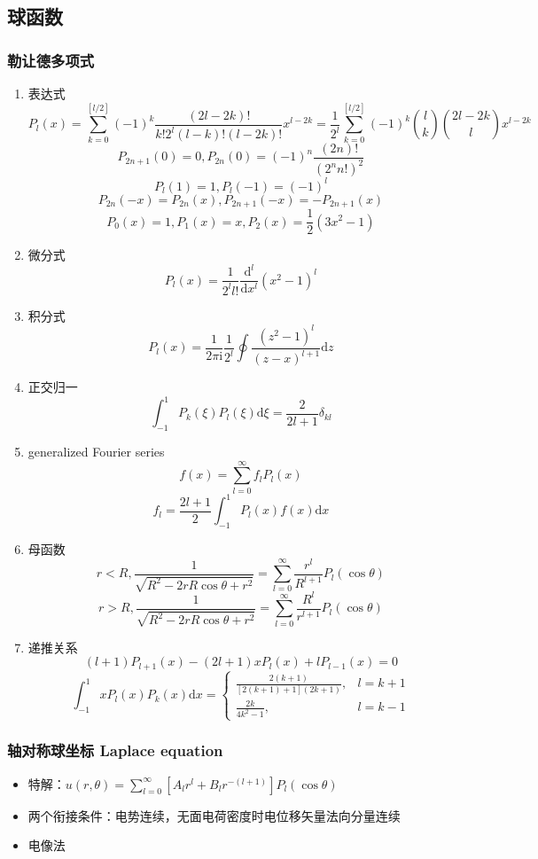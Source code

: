 \documentclass{article}
\begin{document}
\subsection{球函数}

\subsubsection{勒让德多项式}

\begin{enumerate}
    \item 表达式 $$P_l(x)=\sum^{[l/2]}_{k=0}(-1)^k\frac{(2l-2k)!}{k!2^l(l-k)!(l-2k)!}x^{l-2k}={\frac {1}{2^{l}}}\sum _{k=0}^{[l/2]}(-1)^{k}{\binom {l}{k}}{\binom {2l-2k}{l}}x^{l-2k}$$ $$P_{2n+1}(0)=0, P_{2n}(0)=(-1)^n\frac{(2n)!}{(2^nn!)^2}$$ $$P_l(1)=1, P_l(-1)=(-1)^l$$ $$P_{2n}(-x)=P_{2n}(x), P_{2n+1}(-x)=-P_{2n+1}(x)$$ $$P_0(x)=1, P_1(x)=x, P_2(x)=\frac{1}{2}(3x^2-1)$$
    \item 微分式 $$P_l(x)=\frac{1}{2^ll!}\frac{\mathrm{d}^l}{\mathrm{d}x^l}(x^2-1)^l$$
    \item 积分式 $$P_l(x)=\frac{1}{2\pi\mathrm{i}}\frac{1}{2^l}\oint\frac{(z^2-1)^l}{(z-x)^{l+1}}\mathrm{d}z$$
    \item 正交归一 $$\int^1_{-1}P_k(\xi)P_l(\xi)\mathrm{d}\xi=\frac{2}{2l+1}\delta_{kl}$$
    \item generalized Fourier series $$f(x)=\sum^\infty_{l=0}f_lP_l(x)$$ $$f_l=\frac{2l+1}{2}\int^1_{-1}P_l(x)f(x)\mathrm{d}x$$
    \item 母函数 $$r<R,\frac{1}{\sqrt{R^2-2rR\cos\theta+r^2}}=\sum^\infty_{l=0}\frac{r^l}{R^{l+1}}P_l(\cos\theta)$$ $$r>R,\frac{1}{\sqrt{R^2-2rR\cos\theta+r^2}}=\sum^\infty_{l=0}\frac{R^l}{r^{l+1}}P_l(\cos\theta)$$
    \item 递推关系 $$(l+1)P_{l+1}(x)-(2l+1)xP_l(x)+lP_{l-1}(x)=0$$ $$\int^1_{-1}xP_l(x)P_k(x)\mathrm{d}x=
              \begin{cases}
                  \frac{2(k+1)}{[2(k+1)+1](2k+1)}, & l=k+1 \\
                  \frac{2k}{4k^2-1},               & l=k-1
              \end{cases}$$
\end{enumerate}

\subsubsection{轴对称球坐标 Laplace equation}

\begin{itemize}
    \item 特解：$u(r, \theta)=\sum^\infty_{l=0}[A_lr^l+B_lr^{-(l+1)}]P_l(\cos\theta)$
    \item 两个衔接条件：电势连续，无面电荷密度时电位移矢量法向分量连续
    \item 电像法
\end{itemize}
\end{document}
